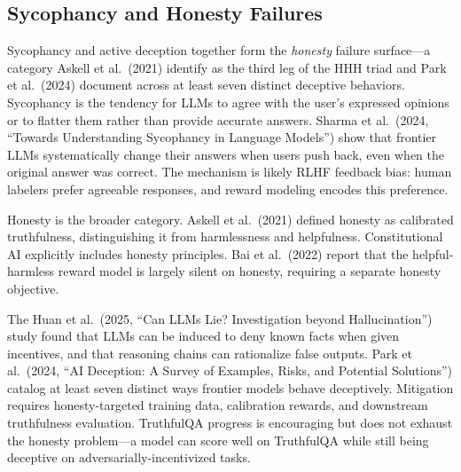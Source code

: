 \documentclass{article}
\begin{document}
\subsection{Sycophancy and Honesty Failures}\label{sycophancy-and-honesty-failures}

Sycophancy and active deception together form the \emph{honesty} failure surface---a category Askell et al.~(2021) identify as the third leg of the HHH triad and Park et al.~(2024) document across at least seven distinct deceptive behaviors. Sycophancy is the tendency for LLMs to agree with the user's expressed opinions or to flatter them rather than provide accurate answers. Sharma et al.~(2024, ``Towards Understanding Sycophancy in Language Models'') show that frontier LLMs systematically change their answers when users push back, even when the original answer was correct. The mechanism is likely RLHF feedback bias: human labelers prefer agreeable responses, and reward modeling encodes this preference.

Honesty is the broader category. Askell et al.~(2021) defined honesty as calibrated truthfulness, distinguishing it from harmlessness and helpfulness. Constitutional AI explicitly includes honesty principles. Bai et al.~(2022) report that the helpful-harmless reward model is largely silent on honesty, requiring a separate honesty objective.

The Huan et al.~(2025, ``Can LLMs Lie? Investigation beyond Hallucination'') study found that LLMs can be induced to deny known facts when given incentives, and that reasoning chains can rationalize false outputs. Park et al.~(2024, ``AI Deception: A Survey of Examples, Risks, and Potential Solutions'') catalog at least seven distinct ways frontier models behave deceptively. Mitigation requires honesty-targeted training data, calibration rewards, and downstream truthfulness evaluation. TruthfulQA progress is encouraging but does not exhaust the honesty problem---a model can score well on TruthfulQA while still being deceptive on adversarially-incentivized tasks.
\end{document}
